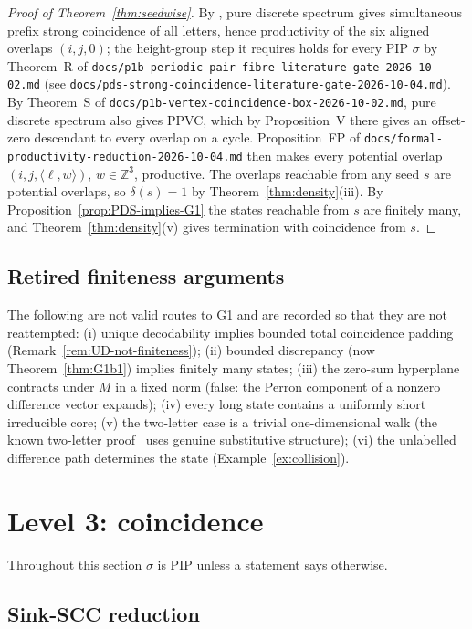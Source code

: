 \documentclass[11pt]{amsart}
\theoremstyle{plain}
\theoremstyle{definition}
\theoremstyle{remark}
\newcommand{\PDS}{pure discrete spectrum}
\begin{document}
\begin{proof}[Proof of Theorem~\ref{thm:seedwise}]
By \cite[Cor.~4.5]{AL14}, \PDS{} gives simultaneous prefix strong coincidence of all letters, hence productivity of the six aligned overlaps $(i,j,0)$; the height-group step it requires holds for every PIP $\sigma$ by Theorem~R of \texttt{docs/p1b-periodic-pair-fibre-literature-gate-2026-10-02.md} (see \texttt{docs/pds-strong-coincidence-literature-gate-2026-10-04.md}). By Theorem~S of \texttt{docs/p1b-vertex-coincidence-box-2026-10-02.md}, \PDS{} also gives PPVC, which by Proposition~V there gives an offset-zero descendant to every overlap on a cycle. Proposition~FP of \texttt{docs/formal-productivity-reduction-2026-10-04.md} then makes every potential overlap $(i,j,\langle\ell,w\rangle)$, $w\in\mathbb Z^3$, productive. The overlaps reachable from any seed $s$ are potential overlaps, so $\delta(s)=1$ by Theorem~\ref{thm:density}(iii). By Proposition~\ref{prop:PDS-implies-G1} the states reachable from $s$ are finitely many, and Theorem~\ref{thm:density}(v) gives termination with coincidence from $s$.
\end{proof}

\subsection{Retired finiteness arguments}\label{sec:retired-level2}
The following are not valid routes to G1 and are recorded so that they are not reattempted: (i) unique decodability implies bounded total coincidence padding (Remark~\ref{rem:UD-not-finiteness}); (ii) bounded discrepancy (now Theorem~\ref{thm:G1b1}) implies finitely many states; (iii) the zero-sum hyperplane contracts under $M$ in a fixed norm (false: the Perron component of a nonzero difference vector expands); (iv) every long state contains a uniformly short irreducible core; (v) the two-letter case is a trivial one-dimensional walk (the known two-letter proof~\cite{BD,HS} uses genuine substitutive structure); (vi) the unlabelled difference path determines the state (Example~\ref{ex:collision}).

\section{Level 3: coincidence}\label{sec:level3}

Throughout this section $\sigma$ is PIP unless a statement says otherwise.

\subsection{Sink-SCC reduction}\label{sec:sink}
\end{document}

